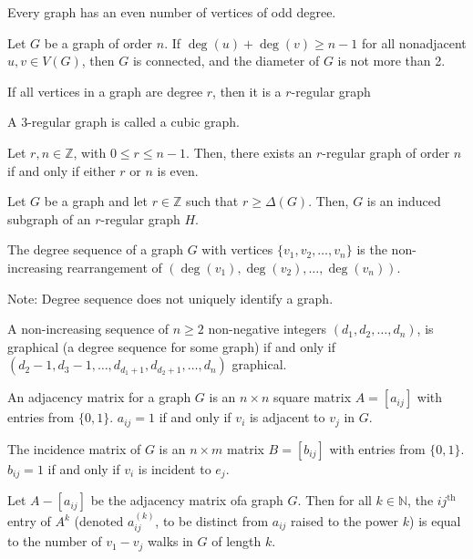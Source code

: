 \documentclass{article}
\newcommand{\N}{\mathbb N}
\begin{document}
\medskip
{}

    Every graph has an even number of vertices of odd degree.

\medskip
{}

    Let $G$ be a graph of order $n$. If $\deg(u) + \deg(v) \geq n-1$ for all nonadjacent $u,v \in V(G)$, then $G$ is connected, and the diameter of $G$ is not more than 2.

\medskip
\noindent{\bf }

\medskip
{}

    If all vertices in a graph are degree $r$, then it is a $r$-regular graph

\medskip
{}

    A 3-regular graph is called a cubic graph.

\medskip
{}

    Let $r, n \in \mathbb Z$, with $0 \leq r \leq n-1$. Then, there exists an $r$-regular graph of order $n$ if and only if either $r$ or $n$ is even.

\medskip
{}

    Let $G$ be a graph and let $r \in \mathbb Z$ such that $r \geq \Delta(G)$. Then, $G$ is an induced subgraph of an $r$-regular graph $H$.

\medskip
{}

    The degree sequence of a graph $G$ with vertices $\{v_1, v_2, \hdots, v_n\}$ is the non-increasing rearrangement of $(\deg(v_1), \deg(v_2), \hdots, \deg(v_n))$.

    Note: Degree sequence does not uniquely identify a graph.

\medskip
{}

    A non-increasing sequence of $n \geq 2$ non-negative integers $(d_1, d_2, \hdots, d_n)$, is graphical (a degree sequence for some graph) if and only if $(d_2-1, d_3-1, \hdots, d_{d_1+1}, d_{d_2+1}, \hdots, d_n)$ graphical.

\medskip
{}

    An adjacency matrix for a graph $G$ is an $n \times n$ square matrix $A = [a_{ij}]$ with entries from $\{0, 1\}$.
    $a_{ij} = 1$ if and only if $v_i$ is adjacent to $v_j$ in $G$.

\medskip
{}

    The incidence matrix of $G$ is an $n \times m$ matrix $B = [b_{ij}]$ with entries from $\{0,1\}$.
    $b_{ij} = 1$ if and only if $v_i$ is incident to $e_j$.

\medskip
{}

    Let $A - [a_{ij}]$ be the adjacency matrix ofa  graph $G$. Then for all $k \in \N$, the $ij^{\text{th}}$ entry of $A^k$ (denoted $a_{ij}^{(k)}$, to be distinct from $a_{ij}$ raised to the power $k$) is equal to the number of $v_1 - v_j$ walks in $G$ of length $k$.
\end{document}
